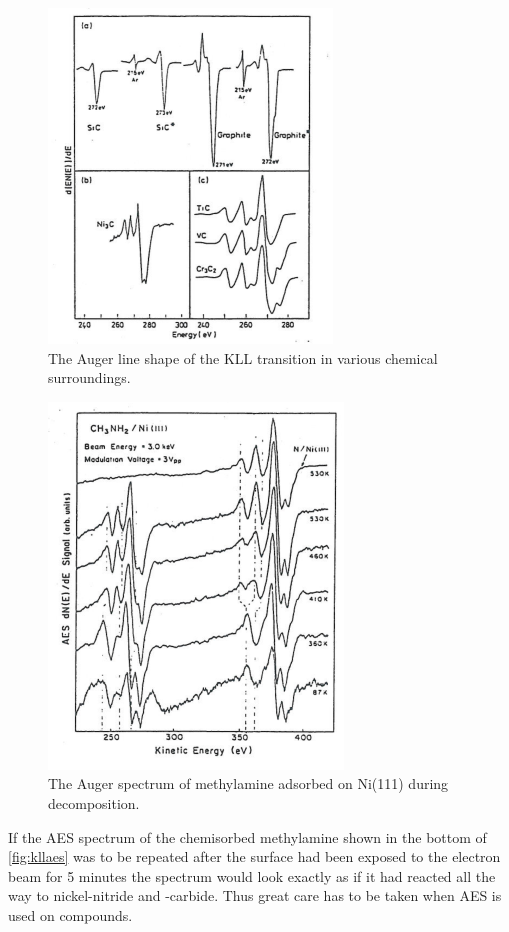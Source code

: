 \begin{figure}[h!]
	\begin{center}
	\includegraphics[scale=4.5]{figures/06_10.png}
	\caption{The Auger line shape of the KLL transition in various chemical surroundings.}
	\label{fig:kllaes}
	\end{center}
\end{figure}

\begin{figure}[h!]
	\begin{center}
	\includegraphics[scale=4]{figures/06_11.png}
	\caption{The Auger spectrum of methylamine adsorbed on Ni(111) during decomposition.}
	\label{fig:niaes}
	\end{center}
\end{figure}

If the AES spectrum of the chemisorbed  methylamine shown in the bottom of \autoref{fig:kllaes} was to be repeated after the surface had been exposed to the electron beam for 5 minutes the spectrum would look exactly as if it had reacted all the way to nickel-nitride and -carbide. Thus great care has to be taken when AES is used on compounds.

